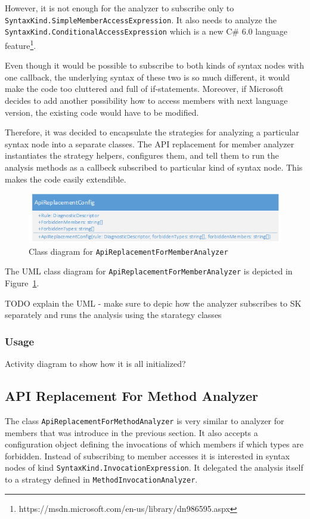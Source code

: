 \documentclass[
  digital, %
  table,   %
  lof,     %
  lot,     %
  oneside,
]{fithesis3}
\begin{document}
However, it is not enough for the analyzer to subscribe only to \texttt{SyntaxKind.SimpleMemberAccessExpression}. It also needs to analyze the \texttt{SyntaxKind.ConditionalAccessExpression} which is a new C\# 6.0 language feature\footnote{https://msdn.microsoft.com/en-us/library/dn986595.aspx}. 

Even though it would be possible to subscribe to both kinds of syntax nodes with one callback, the underlying syntax of these two is so much different, it would make the code too cluttered and full of if-statements. Moreover, if Microsoft decides to add another possibility how to access members with next language version, the existing code would have to be modified.

Therefore, it was decided to encapsulate the strategies for analyzing a particular syntax node into a separate classes. The API replacement for member analyzer instantiates the strategy helpers, configures them, and tell them to run the analysis methods as a callbeck subscribed to particular kind of syntax node. This makes the code easily extendible.

\begin{figure}[h!]
		\centering
			\includegraphics[scale=0.75]{img/uml/api-replacement-for-member}
		\caption{Class diagram for \texttt{ApiReplacementForMemberAnalyzer}}
		\label{fig:uml-api-replacement-for-member}
\end{figure}

The UML class diagram for \texttt{ApiReplacementForMemberAnalyzer} is depicted in Figure~\ref{fig:uml-api-replacement-for-member}.

TODO explain the UML - make sure to depic how the analyzer subscribes to SK separately and runs the analysis using the starategy classes

\subsubsection{Usage}
Activity diagram to show how it is all initialized?

\subsection{API Replacement For Method Analyzer}
The class \texttt{ApiReplacementForMethodAnalyzer} is very similar to analyzer for members that was introduce in the previous section. It also accepts a configuration object defining the invocations of which members if which types are forbidden. 
Instead of subscribing to member accesses it is interested in syntax nodes of kind \texttt{SyntaxKind.InvocationExpression}. It delegated the analysis itself to a strategy defined in \texttt{MethodInvocationAnalyzer}.
\end{document}
